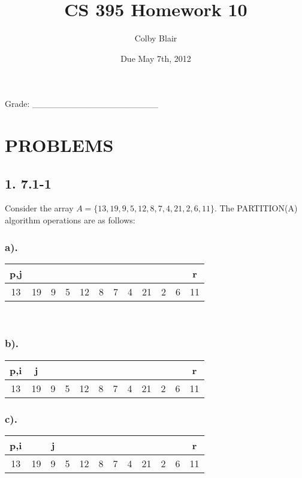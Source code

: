 \documentclass[11pt,letterpaper]{article}
\date{Due May 7th, 2012}
\title{CS 395 Homework 10}
\author{Colby Blair}
\begin{document}
\maketitle

\begin{center}

Grade: \_\_\_\_\_\_\_\_\_\_\_\_\_\_\_\_\_\_\_\_
\end{center}

\thispagestyle{empty}

\pagebreak


\section*{PROBLEMS}

\subsection*{1. 7.1-1}
Consider the array $ A = \{13,19,9,5,12,8,7,4,21,2,6,11\} $. The PARTITION(A) algorithm operations are 
as follows:

\subsubsection*{a).}
\begin{tabular}{ | c | c | c | c | c | c | c | c | c | c | c | c | }
		p,j	&		&		&		&		&		&		&		&		&		&		&	r	\\
	\hline
		13	&	19	&	9	&	5	&	12	&	8	&	7	&	4	&	21	&	2	&	6	&	11	\\
	\hline
\end{tabular} \\

\subsubsection*{b).}
\begin{tabular}{ | c | c | c | c | c | c | c | c | c | c | c | c | }
		p,i	&	j	&		&		&		&		&		&		&		&		&		&	r	\\
	\hline
		13	&	19	&	9	&	5	&	12	&	8	&	7	&	4	&	21	&	2	&	6	&	11	\\
	\hline
\end{tabular}

\subsubsection*{c).}
\begin{tabular}{ | c | c | c | c | c | c | c | c | c | c | c | c | }
		p,i	&		&	j	&		&		&		&		&		&		&		&		&	r	\\
	\hline
		13	&	19	&	9	&	5	&	12	&	8	&	7	&	4	&	21	&	2	&	6	&	11	\\
	\hline
\end{tabular}
\end{document}
